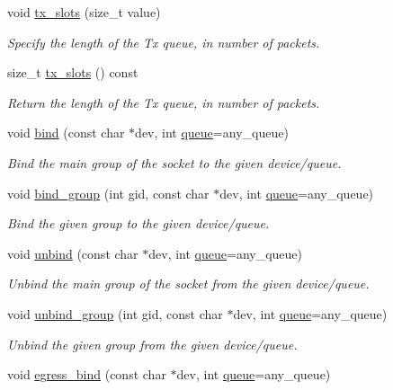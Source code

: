 \begin{DoxyCompactItemize}
void \hyperlink{classpfq_1_1socket_a019d15a072c043d6a1333ca0c836da4c}{tx\+\_\+slots} (size\+\_\+t value)
\begin{DoxyCompactList}\small\item\em Specify the length of the Tx queue, in number of packets. \end{DoxyCompactList}\item 
size\+\_\+t \hyperlink{classpfq_1_1socket_a11b91a39fdae65cace365aa3583eba7d}{tx\+\_\+slots} () const 
\begin{DoxyCompactList}\small\item\em Return the length of the Tx queue, in number of packets. \end{DoxyCompactList}\item 
void \hyperlink{classpfq_1_1socket_a3a0fc5c70e2d2615e29d06ac55007ed3}{bind} (const char $\ast$dev, int \hyperlink{classpfq_1_1queue}{queue}=any\+\_\+queue)
\begin{DoxyCompactList}\small\item\em Bind the main group of the socket to the given device/queue. \end{DoxyCompactList}\item 
void \hyperlink{classpfq_1_1socket_a4d4d44cc68af0290e3c494dcd10b1541}{bind\+\_\+group} (int gid, const char $\ast$dev, int \hyperlink{classpfq_1_1queue}{queue}=any\+\_\+queue)
\begin{DoxyCompactList}\small\item\em Bind the given group to the given device/queue. \end{DoxyCompactList}\item 
void \hyperlink{classpfq_1_1socket_af53d407f46ba2b4d143782ff7d585758}{unbind} (const char $\ast$dev, int \hyperlink{classpfq_1_1queue}{queue}=any\+\_\+queue)
\begin{DoxyCompactList}\small\item\em Unbind the main group of the socket from the given device/queue. \end{DoxyCompactList}\item 
void \hyperlink{classpfq_1_1socket_a6e1f7ee7f44b6824d734d4ff7046d907}{unbind\+\_\+group} (int gid, const char $\ast$dev, int \hyperlink{classpfq_1_1queue}{queue}=any\+\_\+queue)
\begin{DoxyCompactList}\small\item\em Unbind the given group from the given device/queue. \end{DoxyCompactList}\item 
void \hyperlink{classpfq_1_1socket_a2c96741054ea764f5d8c31295ef5df29}{egress\+\_\+bind} (const char $\ast$dev, int \hyperlink{classpfq_1_1queue}{queue}=any\+\_\+queue)

\end{DoxyCompactItemize}
